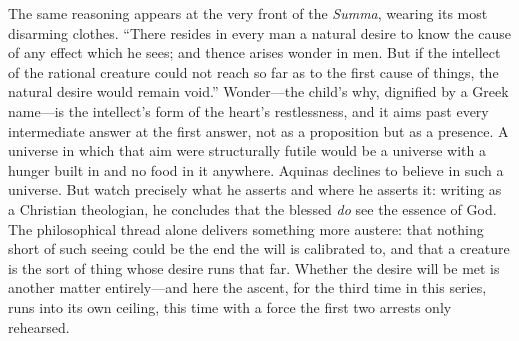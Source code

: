 The same reasoning appears at the very front of the \emph{Summa}, wearing its most disarming clothes. ``There resides in every man a natural desire to know the cause of any effect which he sees; and thence arises wonder in men. But if the intellect of the rational creature could not reach so far as to the first cause of things, the natural desire would remain void.'' Wonder---the child's why, dignified by a Greek name---is the intellect's form of the heart's restlessness, and it aims past every intermediate answer at the first answer, not as a proposition but as a presence. A universe in which that aim were structurally futile would be a universe with a hunger built in and no food in it anywhere. Aquinas declines to believe in such a universe. But watch precisely what he asserts and where he asserts it: writing as a Christian theologian, he concludes that the blessed \emph{do} see the essence of God. The philosophical thread alone delivers something more austere: that nothing short of such seeing could be the end the will is calibrated to, and that a creature is the sort of thing whose desire runs that far. Whether the desire will be met is another matter entirely---and here the ascent, for the third time in this series, runs into its own ceiling, this time with a force the first two arrests only rehearsed.

